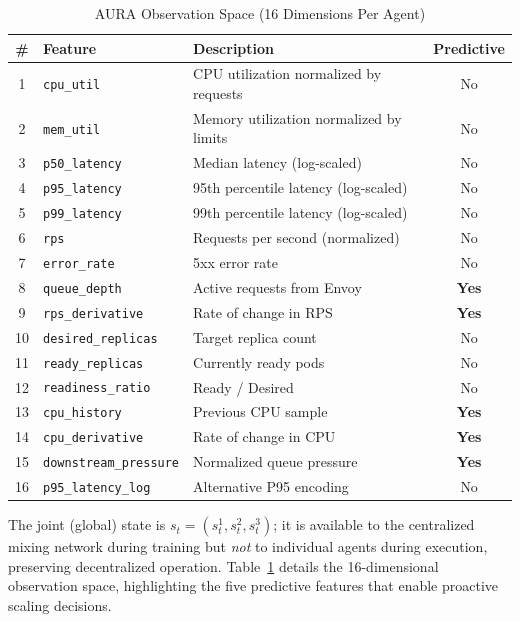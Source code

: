\documentclass[conference]{IEEEtran}
\begin{document}
\begin{table}[t]
\centering
\caption{AURA Observation Space (16 Dimensions Per Agent)}
\label{tab:obs-space}
\setlength{\tabcolsep}{4pt}
\begin{tabular}{@{}clp{9.0cm}c@{}}
\toprule
\textbf{\#} & \textbf{Feature} & \textbf{Description} & \textbf{Predictive} \\
\midrule
1 & \texttt{cpu\_util} & CPU utilization normalized by requests & No \\
2 & \texttt{mem\_util} & Memory utilization normalized by limits & No \\
3 & \texttt{p50\_latency} & Median latency (log-scaled) & No \\
4 & \texttt{p95\_latency} & 95th percentile latency (log-scaled) & No \\
5 & \texttt{p99\_latency} & 99th percentile latency (log-scaled) & No \\
6 & \texttt{rps} & Requests per second (normalized) & No \\
7 & \texttt{error\_rate} & 5xx error rate & No \\
8 & \texttt{queue\_depth} & Active requests from Envoy & \textbf{Yes} \\
9 & \texttt{rps\_derivative} & Rate of change in RPS & \textbf{Yes} \\
10 & \texttt{desired\_replicas} & Target replica count & No \\
11 & \texttt{ready\_replicas} & Currently ready pods & No \\
12 & \texttt{readiness\_ratio} & Ready / Desired & No \\
13 & \texttt{cpu\_history} & Previous CPU sample & \textbf{Yes} \\
14 & \texttt{cpu\_derivative} & Rate of change in CPU & \textbf{Yes} \\
15 & \texttt{downstream\_pressure} & Normalized queue pressure & \textbf{Yes} \\
16 & \texttt{p95\_latency\_log} & Alternative P95 encoding & No \\
\bottomrule
\end{tabular}
\end{table}

The joint (global) state is $s_t = (s_t^1, s_t^2, s_t^3)$; it is
available to the centralized mixing network during training but
\emph{not} to individual agents during execution, preserving
decentralized operation. Table~\ref{tab:obs-space} details the
16-dimensional observation space, highlighting the five predictive
features that enable proactive scaling decisions.
\end{document}
